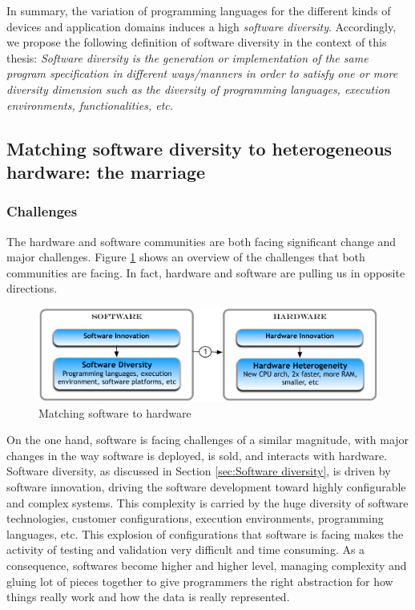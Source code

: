 In summary, the variation of programming languages for the different kinds of devices and application domains induces a high \textit{software diversity}. Accordingly, we propose the following definition of software diversity in the context of this thesis: 
\textit{Software diversity is the generation or implementation of the same program specification in different ways/manners in order to satisfy one or more diversity dimension such as the diversity of programming languages, execution environments, functionalities, etc. }
		




\subsection{Matching software diversity to heterogeneous hardware: the marriage}
\subsubsection{Challenges}
The hardware and software communities are both facing significant change and major challenges. Figure \ref{fig:marriage} shows an overview of the challenges that both communities are facing. In fact, hardware and software are pulling us in opposite directions. 

\begin{figure}[h]
	\center
	\includegraphics[scale=0.65]{Background/fig/marriage}
	\caption{Matching software to hardware}
	\label{fig:marriage}
\end{figure}


On the one hand, software is facing challenges of a similar magnitude, with major changes in the way software is deployed, is sold, and interacts with hardware. 
Software diversity, as discussed in Section \ref{sec:Software diversity}, is driven by software innovation, driving the software development toward highly configurable and complex systems. This complexity is carried by the huge diversity of software technologies, customer configurations, execution environments, programming languages, etc. This explosion of configurations that software is facing makes the activity of testing and validation very difficult and time consuming. 
As a consequence, softwares become higher and higher level, managing complexity and gluing lot of pieces together to give programmers the right abstraction for how things really work and how the data is really represented. 


